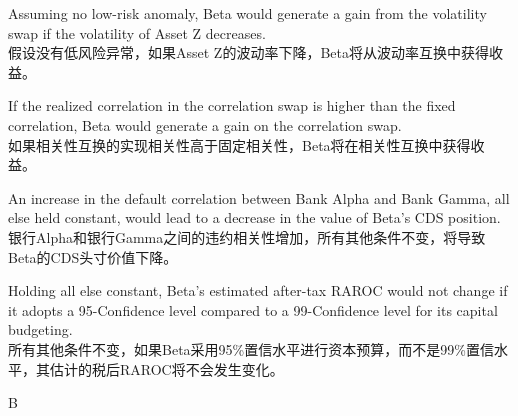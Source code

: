 \documentclass{article}
\begin{document}
\begin{choices}
    \item Assuming no low-risk anomaly, Beta would generate a gain from the volatility swap if the volatility of Asset Z decreases.\\
        假设没有低风险异常，如果Asset Z的波动率下降，Beta将从波动率互换中获得收益。
    \item If the realized correlation in the correlation swap is higher than the fixed correlation, Beta would generate a gain on the correlation swap.\\
        如果相关性互换的实现相关性高于固定相关性，Beta将在相关性互换中获得收益。
    \item An increase in the default correlation between Bank Alpha and Bank Gamma, all else held constant, would lead to a decrease in the value of Beta's CDS position.\\
        银行Alpha和银行Gamma之间的违约相关性增加，所有其他条件不变，将导致Beta的CDS头寸价值下降。
    \item Holding all else constant, Beta's estimated after-tax RAROC would not change if it adopts a 95-Confidence level compared to a 99-Confidence level for its capital budgeting.\\
        所有其他条件不变，如果Beta采用95\%置信水平进行资本预算，而不是99\%置信水平，其估计的税后RAROC将不会发生变化。
\end{choices}

\begin{correctanswer}
    B
\end{correctanswer}
\end{document}
